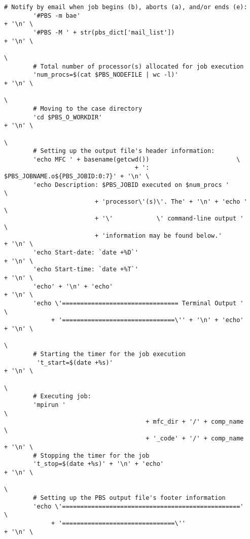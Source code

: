 \documentclass[11pt]{article}
\begin{document}
\begin{lstlisting}[style=BashInputStyle]
        # Notify by email when job begins (b), aborts (a), and/or ends (e):
        '#PBS -m bae'                                                   + '\n' \
        '#PBS -M ' + str(pbs_dict['mail_list'])                         + '\n' \
                                                                               \
        # Total number of processor(s) allocated for job execution
        'num_procs=$(cat $PBS_NODEFILE | wc -l)'                        + '\n' \
                                                                               \
        # Moving to the case directory
        'cd $PBS_O_WORKDIR'                                             + '\n' \
                                                                               \
        # Setting up the output file's header information:
        'echo MFC ' + basename(getcwd())                        \
                                    + ': $PBS_JOBNAME.o${PBS_JOBID:0:7}' + '\n' \
        'echo Description: $PBS_JOBID executed on $num_procs '                 \
                         + 'processor\'(s)\'. The' + '\n' + 'echo '            \
                         + '\'            \' command-line output '             \
                         + 'information may be found below.'            + '\n' \
        'echo Start-date: `date +%D`'                                   + '\n' \
        'echo Start-time: `date +%T`'                                   + '\n' \
        'echo' + '\n' + 'echo'                                          + '\n' \
        'echo \'================================ Terminal Output '             \
             + '===============================\'' + '\n' + 'echo'      + '\n' \
                                                                               \
        # Starting the timer for the job execution
         't_start=$(date +%s)'                                          + '\n' \
                                                                               \
        # Executing job:
        'mpirun '                                                              \
                                       + mfc_dir + '/' + comp_name             \
                                       + '_code' + '/' + comp_name      + '\n' \
        # Stopping the timer for the job
        't_stop=$(date +%s)' + '\n' + 'echo'                            + '\n' \
                                                                               \
        # Setting up the PBS output file's footer information
        'echo \'================================================='             \
             + '===============================\''                      + '\n' \

\end{lstlisting}
\end{document}
